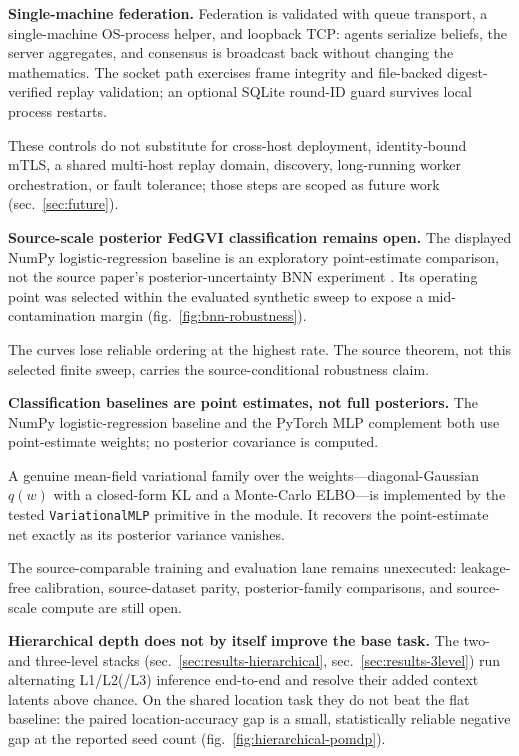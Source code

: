 \documentclass[
  english,
]{article}
\theoremstyle{plain}
\theoremstyle{definition}
\theoremstyle{remark}
\theoremstyle{definition}
\begin{document}
\textbf{Single-machine federation.} Federation is validated with queue
transport, a single-machine OS-process helper, and loopback TCP: agents
serialize beliefs, the server aggregates, and consensus is broadcast
back without changing the mathematics. The socket path exercises frame
integrity and file-backed digest-verified replay validation; an optional
SQLite round-ID guard survives local process restarts.

These controls do not substitute for cross-host deployment,
identity-bound mTLS, a shared multi-host replay domain, discovery,
long-running worker orchestration, or fault tolerance; those steps are
scoped as future work (sec.~\ref{sec:future}).

\textbf{Source-scale posterior FedGVI classification remains open.} The
displayed NumPy logistic-regression baseline is an exploratory
point-estimate comparison, not the source paper's posterior-uncertainty
BNN experiment \citep{mildner2025fedgvi}. Its operating point was
selected within the evaluated synthetic sweep to expose a
mid-contamination margin (fig.~\ref{fig:bnn-robustness}).

The curves lose reliable ordering at the highest rate. The source
theorem, not this selected finite sweep, carries the source-conditional
robustness claim.

\textbf{Classification baselines are point estimates, not full
posteriors.} The NumPy logistic-regression baseline and the PyTorch MLP
complement both use point-estimate weights; no posterior covariance is
computed.

A genuine mean-field variational family over the
weights---diagonal-Gaussian \(q(w)\) with a closed-form KL and a
Monte-Carlo ELBO---is implemented by the tested \texttt{VariationalMLP}
primitive in the  module. It recovers
the point-estimate net exactly as its posterior variance vanishes.

The source-comparable training and evaluation lane remains unexecuted:
leakage-free calibration, source-dataset parity, posterior-family
comparisons, and source-scale compute are still open.

\textbf{Hierarchical depth does not by itself improve the base task.}
The two- and three-level stacks (sec.~\ref{sec:results-hierarchical},
sec.~\ref{sec:results-3level}) run alternating L1/L2(/L3) inference
end-to-end and resolve their added context latents above chance. On the
shared location task they do not beat the flat baseline: the paired
location-accuracy gap is a small, statistically reliable negative gap at
the reported seed count (fig.~\ref{fig:hierarchical-pomdp}).
\end{document}
